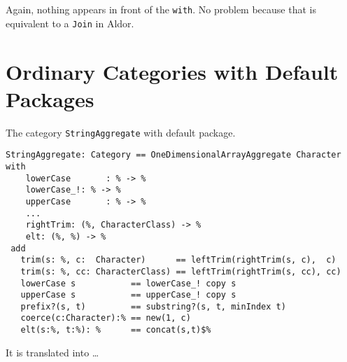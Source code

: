 \documentclass{article}
\begin{document}
  Again, nothing appears in front of the \verb'with'. No problem
  because that is equivalent to a \verb'Join' in Aldor.


















\section{Ordinary Categories with Default Packages}
\label{sec:Category+Default}
The category \verb'StringAggregate' with default package.
\begin{verbatim}
StringAggregate: Category == OneDimensionalArrayAggregate Character with
    lowerCase       : % -> %
    lowerCase_!: % -> %
    upperCase       : % -> %
    ...
    rightTrim: (%, CharacterClass) -> %
    elt: (%, %) -> %
 add
   trim(s: %, c:  Character)      == leftTrim(rightTrim(s, c),  c)
   trim(s: %, cc: CharacterClass) == leftTrim(rightTrim(s, cc), cc)
   lowerCase s           == lowerCase_! copy s
   upperCase s           == upperCase_! copy s
   prefix?(s, t)         == substring?(s, t, minIndex t)
   coerce(c:Character):% == new(1, c)
   elt(s:%, t:%): %      == concat(s,t)$%
\end{verbatim}
It is translated into \ldots
\end{document}
